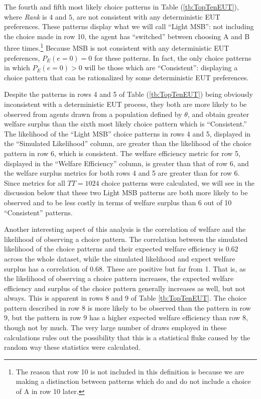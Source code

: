 \documentclass[../main.tex]{subfiles}
\begin{document}
The fourth and fifth most likely choice patterns in Table (\ref{tb:TopTenEUT}), where \textit{Rank} is $4$ and $5$, are not consistent with any deterministic EUT preferences.
These patterns display what we will call \enquote{Light MSB}: not including the choice made in row 10, the agent has \enquote{switched} between choosing A and B three times.\footnote{
	The reason that row 10 is not included in this definition is because we are making a distinction between patterns which do and do not include a choice of A in row 10 later.
}
Because MSB is not consistent with any deterministic EUT preferences, $P_E(e=0)=0$ for these patterns.
In fact, the only choice patterns in which $P_E(e=0)>0$ will be those which are \enquote{Consistent}: displaying a choice pattern that can be rationalized by some deterministic EUT preferences.

Despite the patterns in rows 4 and 5 of Table (\ref{tb:TopTenEUT}) being obviously inconsistent with a deterministic EUT process, they both are more likely to be observed from agents drawn from a population defined by $\theta$, and obtain greater welfare surplus than the sixth most likely choice pattern which is \enquote{Consistent.}
The likelihood of the \enquote{Light MSB} choice patterns in rows 4 and 5, displayed in the \enquote{Simulated Likelihood} column, are greater than the likelihood of the choice pattern in row 6, which is consistent.
The welfare efficiency metric for row 5, displayed in the \enquote{Welfare Efficiency} column, is greater than that of row 6, and the welfare surplus metrics for both rows 4 and 5 are greater than for row 6.
Since metrics for all $TT = 1024$ choice patterns were calculated, we will see in the discussion below that these two Light MSB patterns are both more likely to be observed and to be less costly in terms of welfare surplus than 6 out of 10 \enquote{Consistent} patterns.

Another interesting aspect of this analysis is the correlation of welfare and the likelihood of observing a choice pattern.
The correlation between the simulated likelihood of the choice patterns and their expected welfare efficiency is $0.62$ across the whole dataset, while the simulated likelihood and expect welfare surplus has a correlation of $0.68$.
These are positive but far from 1.
That is, as the likelihood of observing a choice pattern increases, the expected welfare efficiency and surplus of the choice pattern generally increases as well, but not always.
This is apparent in rows 8 and 9 of Table \ref{tb:TopTenEUT}.
The choice pattern described in row 8 is more likely to be observed than the pattern in row 9, but the pattern in row 9 has a higher expected welfare efficiency than row 8, though not by much.
The very large number of draws employed in these calculations rules out the possibility that this is a statistical fluke caused by the random way these statistics were calculated.
\end{document}
